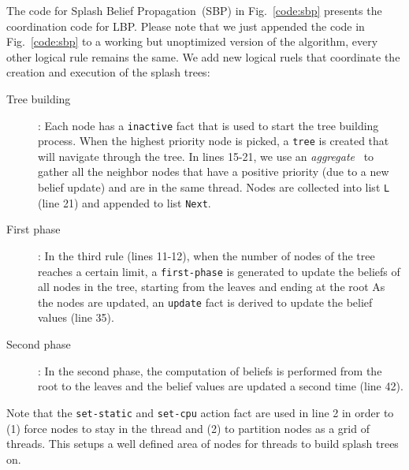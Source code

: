 The code for Splash Belief Propagation~(SBP) in Fig.~\ref{code:sbp} presents the
coordination code for LBP.  Please note that we just appended the code in
Fig.~\ref{code:sbp} to a working but unoptimized version of the algorithm, every
other logical rule remains the same. We add new logical ruels that coordinate
the creation and execution of the splash trees:

\begin{description}
   \item[Tree building]: Each node has a \texttt{inactive} fact that is used to
   start the tree building process. When the highest priority node is picked, a
   \texttt{tree} is created that will navigate through the tree. In lines 15-21,
   we use an \emph{aggregate}~\cite{cruz-iclp14} to gather all the neighbor
   nodes that have a positive priority (due to a new belief update) and are in the
   same thread. Nodes are collected into list \texttt{L} (line 21) and
   appended to list \texttt{Next}.
   
   \item[First phase]: In the
   third rule (lines 11-12), when the number of nodes of the tree reaches a
   certain limit, a \texttt{first-phase} is generated to update the beliefs of
   all nodes in the tree, starting from the leaves and ending at the root As the
   nodes are updated, an \texttt{update} fact is derived to update the belief
   values (line 35).

   \item[Second phase]: In the second phase, the computation of beliefs is
   performed from the root to the leaves and the belief values are updated a
   second time (line 42).
\end{description}

Note that the \texttt{set-static} and \texttt{set-cpu} action fact are used in
line 2 in order to (1) force nodes to stay in the thread and (2) to partition
nodes as a grid of threads. This setups a well defined area of nodes
for threads to build splash trees on.


